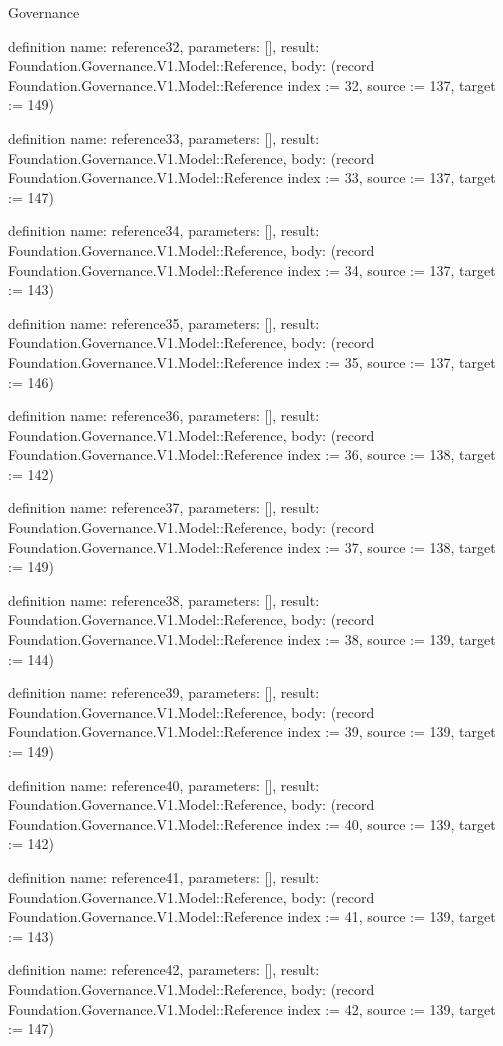\begin{lexlean}{Governance}
\begin{semanticmodule}
definition{
  name: reference32,
  parameters: [],
  result: Foundation.Governance.V1.Model::Reference,
  body: (record Foundation.Governance.V1.Model::Reference {index := 32, source := 137, target := 149})
}

definition{
  name: reference33,
  parameters: [],
  result: Foundation.Governance.V1.Model::Reference,
  body: (record Foundation.Governance.V1.Model::Reference {index := 33, source := 137, target := 147})
}

definition{
  name: reference34,
  parameters: [],
  result: Foundation.Governance.V1.Model::Reference,
  body: (record Foundation.Governance.V1.Model::Reference {index := 34, source := 137, target := 143})
}

definition{
  name: reference35,
  parameters: [],
  result: Foundation.Governance.V1.Model::Reference,
  body: (record Foundation.Governance.V1.Model::Reference {index := 35, source := 137, target := 146})
}

definition{
  name: reference36,
  parameters: [],
  result: Foundation.Governance.V1.Model::Reference,
  body: (record Foundation.Governance.V1.Model::Reference {index := 36, source := 138, target := 142})
}

definition{
  name: reference37,
  parameters: [],
  result: Foundation.Governance.V1.Model::Reference,
  body: (record Foundation.Governance.V1.Model::Reference {index := 37, source := 138, target := 149})
}

definition{
  name: reference38,
  parameters: [],
  result: Foundation.Governance.V1.Model::Reference,
  body: (record Foundation.Governance.V1.Model::Reference {index := 38, source := 139, target := 144})
}

definition{
  name: reference39,
  parameters: [],
  result: Foundation.Governance.V1.Model::Reference,
  body: (record Foundation.Governance.V1.Model::Reference {index := 39, source := 139, target := 149})
}

definition{
  name: reference40,
  parameters: [],
  result: Foundation.Governance.V1.Model::Reference,
  body: (record Foundation.Governance.V1.Model::Reference {index := 40, source := 139, target := 142})
}

definition{
  name: reference41,
  parameters: [],
  result: Foundation.Governance.V1.Model::Reference,
  body: (record Foundation.Governance.V1.Model::Reference {index := 41, source := 139, target := 143})
}

definition{
  name: reference42,
  parameters: [],
  result: Foundation.Governance.V1.Model::Reference,
  body: (record Foundation.Governance.V1.Model::Reference {index := 42, source := 139, target := 147})
}


\end{semanticmodule}
\end{lexlean}
